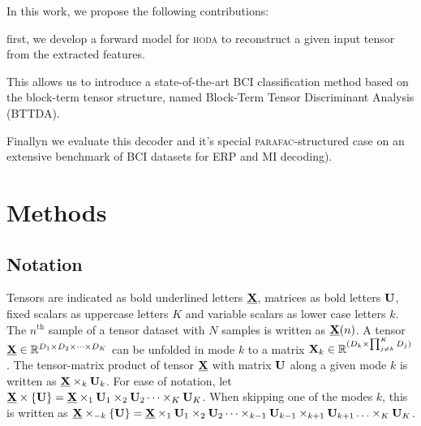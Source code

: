 \documentclass[twocolumn]{article}
\begin{document}

In this work, we propose the following contributions:
\begin{enumerate*}[label={\arabic*)}]
  \item first, we develop a forward model for \textsc{hoda} to reconstruct a
    given input tensor from the extracted features.
  \item This allows us to introduce a state-of-the-art BCI classification method based on the
    block-term tensor structure, named Block-Term Tensor Discriminant Analysis
    (\textsc{BTTDA}).
  \item Finallyn we evaluate this decoder and it's special
    \textsc{parafac}-structured case on an extensive benchmark of BCI
    datasets for ERP and MI decoding).
\end{enumerate*}

\section{Methods}

\subsection{Notation}
Tensors are indicated as bold underlined letters $\ten{X}$, matrices as bold
letters $\mat{U}$, fixed scalars as uppercase letters $K$ and variable
scalars as lower case letters $k$.
The $n^\text{th}$ sample of a tensor dataset with $N$ samples is written as
$\ten{X}(n)$.
A tensor $\ten{X}\in \mathbb{R}^{D_1\times D_2 \times \cdots \times D_K}$ can be unfolded in mode
$k$ to a matrix $\mat{X}_k\in\mathbb{R}^{(D_k\times\prod_{j\neq k}^K D_j)}$.
The tensor-matrix product of tensor $\ten{X}$ with matrix $\mat{U}$ along a
given mode $k$ is written as $\ten{X}\mpr{\mat{U}}{k}$. For ease of notation, let
$\ten{X}\mmpr{\mat{U}} =
	\ten{X}\mpr{\mat{U}}{1}\mpr{\mat{U}}{2}\cdots\mpr{\mat{U}}{K}$.
When skipping one of the modes $k$, this is
written as $\ten{X}\mmprs{\mat{U}}{k} =
	\ten{X}\mpr{\mat{U}}{1}\mpr{\mat{U}}{2}\cdots\mpr{\mat{U}}{k-1}\mpr{\mat{U}}{k+1}\ldots\mpr{\mat{U}}{K}$.
\end{document}
